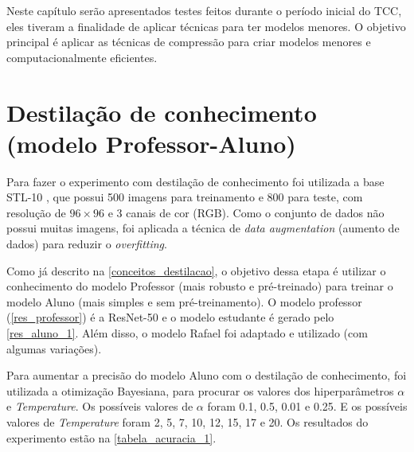 Neste capítulo serão apresentados testes feitos durante o período inicial do TCC, eles tiveram a finalidade de aplicar técnicas para ter modelos menores.
O objetivo principal é aplicar as técnicas de compressão para criar modelos menores e computacionalmente eficientes.

\section{Destilação de conhecimento (modelo Professor-Aluno)}
Para fazer o experimento com destilação de conhecimento foi utilizada a base STL-10 \cite{stl10}, que possui 500 imagens para
treinamento e 800 para teste, com resolução de $96 \times 96$ e 3 canais de cor (RGB). Como o conjunto de dados
não possui muitas imagens, foi aplicada a técnica de \textit{data augmentation} (aumento de dados) para reduzir o
\textit{overfitting}.

Como já descrito na \autoref{conceitos_destilacao}, o objetivo dessa etapa é utilizar o conhecimento do modelo
Professor (mais robusto e pré-treinado) para treinar o modelo Aluno (mais simples e sem pré-treinamento).
O modelo professor (\autoref{res_professor}) é a ResNet-50  \cite{resnet} e o modelo estudante é gerado pelo
\autoref{res_aluno_1}.
Além disso, o modelo Rafael \cite{rafael} foi adaptado e utilizado (com algumas variações).

Para aumentar a precisão do modelo Aluno com o destilação de conhecimento, foi utilizada a otimização
Bayesiana, para procurar os valores dos hiperparâmetros $\alpha$ e \textit{Temperature}.
Os possíveis valores de $\alpha$ foram 0.1, 0.5, 0.01 e 0.25.
E os possíveis valores de \textit{Temperature} foram 2, 5, 7, 10, 12, 15, 17 e 20.
Os resultados do experimento estão na \autoref{tabela_acuracia_1}.

